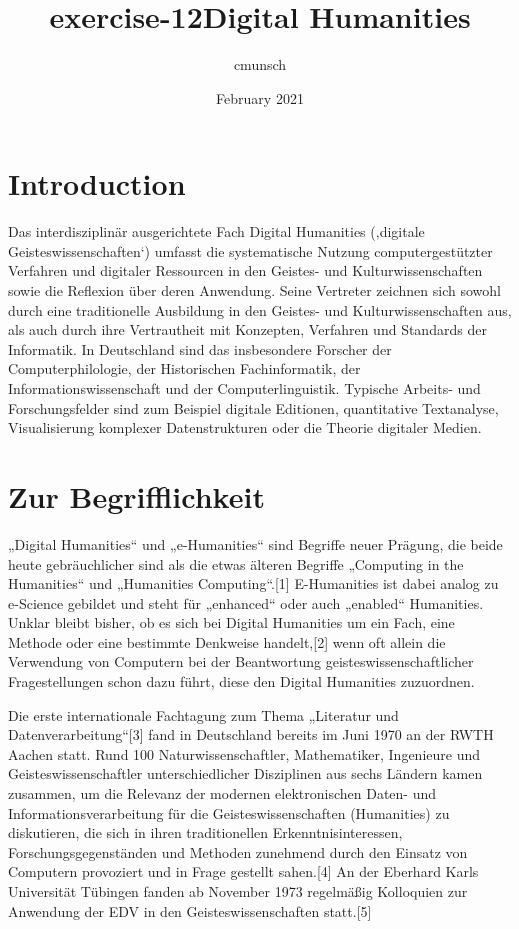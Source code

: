 \documentclass{article}
\title{exercise-12}
\author{cmunsch}
\date{February 2021}
\begin{document}
\title{Digital Humanities}

\maketitle
\tableofcontents
\section{Introduction}


Das interdisziplinär ausgerichtete Fach Digital Humanities (‚digitale Geisteswissenschaften‘) umfasst die systematische Nutzung computergestützter Verfahren und digitaler Ressourcen in den Geistes- und Kulturwissenschaften sowie die Reflexion über deren Anwendung. Seine Vertreter zeichnen sich sowohl durch eine traditionelle Ausbildung in den Geistes- und Kulturwissenschaften aus, als auch durch ihre Vertrautheit mit Konzepten, Verfahren und Standards der Informatik. In Deutschland sind das insbesondere Forscher der Computerphilologie, der Historischen Fachinformatik, der Informationswissenschaft und der Computerlinguistik. Typische Arbeits- und Forschungsfelder sind zum Beispiel digitale Editionen, quantitative Textanalyse, Visualisierung komplexer Datenstrukturen oder die Theorie digitaler Medien.


\section{Zur Begrifflichkeit}
„Digital Humanities“ und „e-Humanities“ sind Begriffe neuer Prägung, die beide heute gebräuchlicher sind als die etwas älteren Begriffe „Computing in the Humanities“ und „Humanities Computing“.[1] E-Humanities ist dabei analog zu e-Science gebildet und steht für „enhanced“ oder auch „enabled“ Humanities. Unklar bleibt bisher, ob es sich bei Digital Humanities um ein Fach, eine Methode oder eine bestimmte Denkweise handelt,[2] wenn oft allein die Verwendung von Computern bei der Beantwortung geisteswissenschaftlicher Fragestellungen schon dazu führt, diese den Digital Humanities zuzuordnen.

Die erste internationale Fachtagung zum Thema „Literatur und Datenverarbeitung“[3] fand in Deutschland bereits im Juni 1970 an der RWTH Aachen statt. Rund 100 Naturwissenschaftler, Mathematiker, Ingenieure und Geisteswissenschaftler unterschiedlicher Disziplinen aus sechs Ländern kamen zusammen, um die Relevanz der modernen elektronischen Daten- und Informationsverarbeitung für die Geisteswissenschaften (Humanities) zu diskutieren, die sich in ihren traditionellen Erkenntnisinteressen, Forschungsgegenständen und Methoden zunehmend durch den Einsatz von Computern provoziert und in Frage gestellt sahen.[4] An der Eberhard Karls Universität Tübingen fanden ab November 1973 regelmäßig Kolloquien zur Anwendung der EDV in den Geisteswissenschaften statt.[5]
\end{document}

